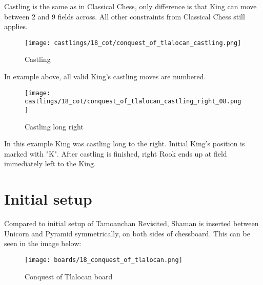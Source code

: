 Castling is the same as in Classical Chess, only difference is that King can move between 2 and 9 fields across.
All other constraints from Classical Chess still applies.

\noindent
\begin{figure}[!h]
\texttt{[image: castlings/18\_cot/conquest\_of\_tlalocan\_castling.png]}
\caption{Castling}
\label{fig:conquest_of_tlalocan_castling}
\end{figure}

In example above, all valid King's castling moves are numbered.

\noindent
\begin{figure}[!h]
\texttt{[image: castlings/18\_cot/conquest\_of\_tlalocan\_castling\_right\_08.png]}
\caption{Castling long right}
\label{fig:conquest_of_tlalocan_castling_right_08}
\end{figure}

In this example King was castling long to the right. Initial King's position is marked with "K".
After castling is finished, right Rook ends up at field immediately left to the King.

\clearpage %

\section*{Initial setup}

Compared to initial setup of Tamoanchan Revisited, Shaman is inserted between Unicorn and Pyramid
symmetrically, on both sides of chessboard. This can be seen in the image below:

\noindent
\begin{figure}[h]
\texttt{[image: boards/18\_conquest\_of\_tlalocan.png]}
\caption{Conquest of Tlalocan board}
\label{fig:18_conquest_of_tlalocan}
\end{figure}

\clearpage %
